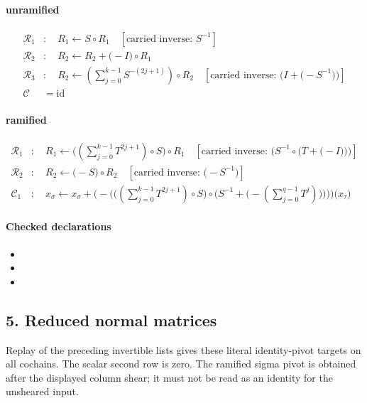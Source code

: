 \paragraph{unramified}
\[\begin{aligned}\mathcal R_{1}&:\quad R_1 \leftarrow S\circ R_1\quad[\text{carried inverse: }S^{-1}]\\\mathcal R_{2}&:\quad R_2 \leftarrow R_2+\bigl(-I\bigr)\circ R_1\\\mathcal R_{3}&:\quad R_2 \leftarrow \left(\sum_{j=0}^{k-1}S^{-(2j+1)}\right)\circ R_2\quad[\text{carried inverse: }\bigl(I+\bigl(-S^{-1}\bigr)\bigr)]\\\mathcal C&=\mathrm{id}\end{aligned}\]
\paragraph{ramified}
\[\begin{aligned}\mathcal R_{1}&:\quad R_1 \leftarrow \bigl(\left(\sum_{j=0}^{k-1}T^{2j+1}\right)\circ S\bigr)\circ R_1\quad[\text{carried inverse: }\bigl(S^{-1}\circ \bigl(T+\bigl(-I\bigr)\bigr)\bigr)]\\\mathcal R_{2}&:\quad R_2 \leftarrow \bigl(-S\bigr)\circ R_2\quad[\text{carried inverse: }\bigl(-S^{-1}\bigr)]\\\mathcal C_{1}&:\quad x_{\sigma}\leftarrow x_{\sigma}+\bigl(-\bigl(\bigl(\left(\sum_{j=0}^{k-1}T^{2j+1}\right)\circ S\bigr)\circ \bigl(S^{-1}+\bigl(-\left(\sum_{j=0}^{q-1}T^{j}\right)\bigr)\bigr)\bigr)\bigr)\bigl(x_{\tau}\bigr)\end{aligned}\]
\paragraph{Checked declarations}
\begin{itemize}
\item {}
\item {}
\item {}
\end{itemize}

\subsection*{5. Reduced normal matrices}
Replay of the preceding invertible lists gives these literal identity-pivot targets on all cochains. The scalar second row is zero. The ramified sigma pivot is obtained after the displayed column shear; it must not be read as an identity for the unsheared input.

